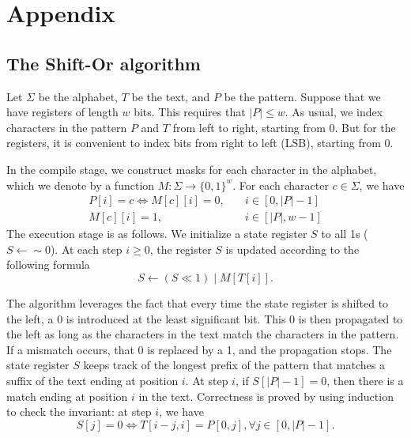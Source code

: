 \appendix
\chapter[Appendix]{Appendix}

\section{The Shift-Or algorithm}
\label{sec:shift-or}
Let $\Sigma$ be the alphabet, $T$ be the text, and $P$ be the pattern. Suppose that we have registers of length $w$ bits. This requires that $|P| \leq w$. As usual, we index characters in the pattern $P$ and $T$ from left to right, starting from $0$. But for the registers, it is convenient to index bits from right to left (LSB), starting from $0$.

In the compile stage, we construct masks for each character in the alphabet, which we denote by a function $M: \Sigma \to \{0,1\}^w$. For each character $c \in \Sigma$, we have
\begin{equation}
  \begin{aligned}
    P[i] = c \iff M[c][i] = 0, & \quad i\in[0, |P|-1] \\
    M[c][i] = 1,               & \quad i\in[|P|, w-1]
  \end{aligned}
\end{equation}
The execution stage is as follows. We initialize a state register $S$ to all 1s ($S\leftarrow \sim\!\! 0$). At each step $i \geq 0$, the register $S$ is updated according to the following formula
\begin{equation}
  S \gets (S \ll 1) \mid M[T[i]].
\end{equation}

The algorithm leverages the fact that every time the state register is shifted to the left, a 0 is introduced at the least significant bit. This 0 is then propagated to the left as long as the characters in the text match the characters in the pattern. If a mismatch occurs, that 0 is replaced by a 1, and the propagation stops. The state register $S$ keeps track of the longest prefix of the pattern that matches a suffix of the text ending at position $i$. At step $i$, if $S[|P|-1] = 0$, then there is a match ending at position $i$ in the text. Correctness is proved by using induction to check the invariant: at step $i$, we have
\begin{equation}
  S[j] = 0 \iff T[i-j, i] = P[0, j], \forall j \in [0, |P|-1].
\end{equation}

